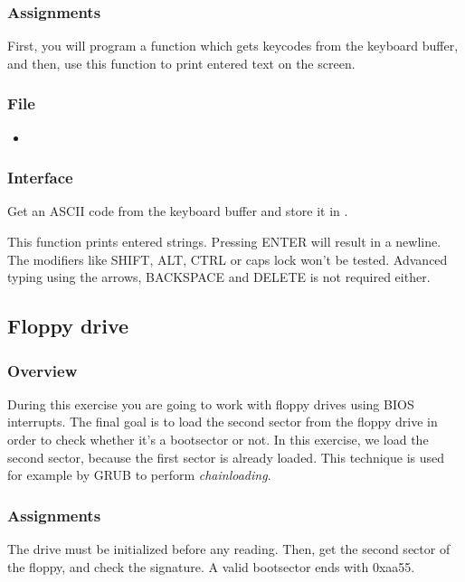 \subsubsection*{Assignments}
First, you will program a function which gets keycodes from the keyboard
buffer, and then, use this function to print entered text on the screen.

\subsubsection*{File}
\begin{itemize}
  \item {}
\end{itemize}

\subsubsection*{Interface}
{
  Get an ASCII code from the keyboard buffer and store it in .
}

{
  This function prints entered strings. Pressing ENTER will result in a
  newline.
  The modifiers like SHIFT, ALT, CTRL or caps lock won't be tested. Advanced
  typing using the arrows, BACKSPACE and DELETE is not required either.
}

%
%

\newpage

\subsection{Floppy drive}

\subsubsection*{Overview}
During this exercise you are going to work with floppy drives using BIOS
interrupts. The final goal is to load the second sector from the floppy drive
in order to check whether it's a bootsector or not. In this exercise, we load the
second sector, because the first sector is already loaded. This technique is used
for example by GRUB to perform \emph{chainloading}.

\subsubsection*{Assignments}
The drive must be initialized before any reading. Then, get the second sector of
the floppy, and check the signature. A valid bootsector ends with 0xaa55.

